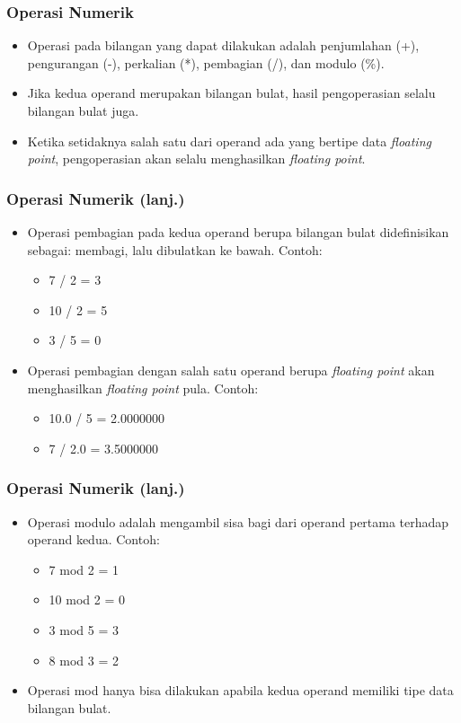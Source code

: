 \begin{frame}
\frametitle{Operasi Numerik}
\begin{itemize}
  \item Operasi pada bilangan yang dapat dilakukan adalah penjumlahan (+), pengurangan (-), perkalian (*), pembagian (/), dan modulo (\%).
  \item Jika kedua operand merupakan bilangan bulat, hasil pengoperasian selalu bilangan bulat juga.
  \item Ketika setidaknya salah satu dari operand ada yang bertipe data \textit{floating point}, pengoperasian akan selalu menghasilkan \textit{floating point}.
\end{itemize}
\end{frame}

\begin{frame}
\frametitle{Operasi Numerik (lanj.)}
\begin{itemize}
  \item Operasi pembagian pada kedua operand berupa bilangan bulat didefinisikan sebagai: membagi, lalu dibulatkan ke bawah. Contoh:
  \begin{itemize}
    \item 7 / 2 = 3
    \item 10 / 2 = 5
    \item 3 / 5 = 0
  \end{itemize}
  \item Operasi pembagian dengan salah satu operand berupa \textit{floating point} akan menghasilkan \textit{floating point} pula. Contoh:
    \begin{itemize}
      \item 10.0 / 5 = 2.0000000
      \item 7 / 2.0 = 3.5000000
    \end{itemize}
\end{itemize}
\end{frame}

\begin{frame}
\frametitle{Operasi Numerik (lanj.)}
\begin{itemize}
  \item Operasi modulo adalah mengambil sisa bagi dari operand pertama terhadap operand kedua. Contoh:
  \begin{itemize}
    \item 7 mod 2 = 1
    \item 10 mod 2 = 0
    \item 3 mod 5 = 3
    \item 8 mod 3 = 2
  \end{itemize}
  \item Operasi mod hanya bisa dilakukan apabila kedua operand memiliki tipe data \alert{bilangan bulat}.
\end{itemize}
\end{frame}


